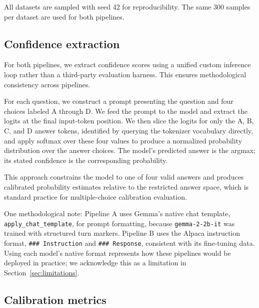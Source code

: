 \documentclass[10pt]{article}
\begin{document}
All datasets are sampled with seed 42 for reproducibility. The same 300 samples per dataset are used for both pipelines.

\subsection{Confidence extraction}

For both pipelines, we extract confidence scores using a unified custom inference loop rather than a third-party evaluation harness. This ensures methodological consistency across pipelines.

For each question, we construct a prompt presenting the question and four choices labeled A through D. We feed the prompt to the model and extract the logits at the final input-token position. We then slice the logits for only the A, B, C, and D answer tokens, identified by querying the tokenizer vocabulary directly, and apply softmax over these four values to produce a normalized probability distribution over the answer choices. The model's predicted answer is the argmax; its stated confidence is the corresponding probability.

This approach constrains the model to one of four valid answers and produces calibrated probability estimates relative to the restricted answer space, which is standard practice for multiple-choice calibration evaluation.

One methodological note: Pipeline A uses Gemma's native chat template, \texttt{apply\_chat\_template}, for prompt formatting, because \texttt{gemma-2-2b-it} was trained with structured turn markers. Pipeline B uses the Alpaca instruction format, \texttt{\#\#\# Instruction} and \texttt{\#\#\# Response}, consistent with its fine-tuning data. Using each model's native format represents how these pipelines would be deployed in practice; we acknowledge this as a limitation in Section~\ref{sec:limitations}.

\subsection{Calibration metrics}
\end{document}
